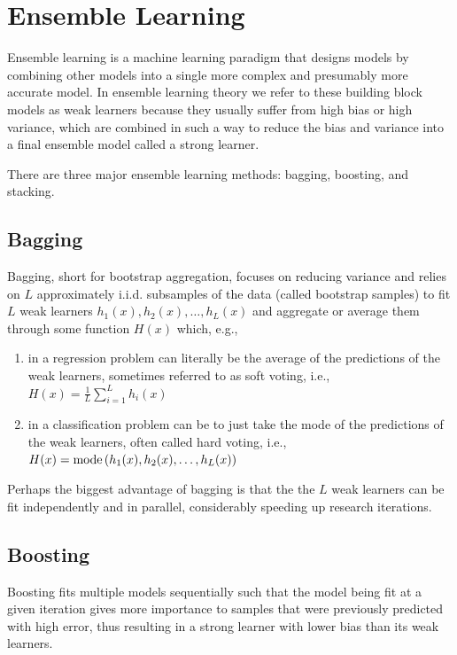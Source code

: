 \section{Ensemble Learning}

Ensemble learning is a machine learning paradigm that designs models by combining other models into a single more complex and presumably more accurate model. In ensemble learning theory we refer to these building block models as weak learners because they usually suffer from high bias or high variance, which are combined in such a way to reduce the bias and variance into a final ensemble model called a strong learner.

There are three major ensemble learning methods: bagging, boosting, and stacking.

\subsection{Bagging}

Bagging, short for bootstrap aggregation, focuses on reducing variance and relies on $L$ approximately i.i.d. subsamples of the data (called bootstrap samples) to fit $L$ weak learners $h_1(x), h_2(x), \ldots, h_L(x)$ and aggregate or average them through some function $H(x)$ which, e.g.,

\begin{enumerate}
    \item in a regression problem can literally be the average of the predictions of the weak learners, sometimes referred to as soft voting, i.e., $H(x) = \frac{1}{L} \sum_{i=1}^{L} h_i(x)$
    \item in a classification problem can be to just take the mode of the predictions of the weak learners, often called hard voting, i.e., $H(x) = \operatorname*{mode}{(h_1(x), h_2(x), \ldots, h_L(x))}$
\end{enumerate}

Perhaps the biggest advantage of bagging is that the the $L$ weak learners can be fit independently and in parallel, considerably speeding up research iterations.

\subsection{Boosting}

Boosting fits multiple models sequentially such that the model being fit at a given iteration gives more importance to samples that were previously predicted with high error, thus resulting in a strong learner with lower bias than its weak learners.

